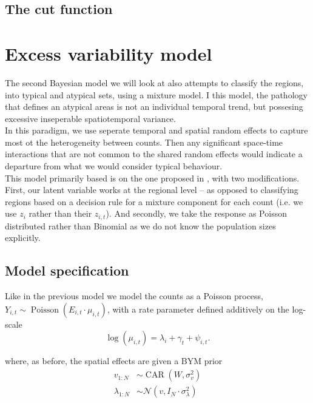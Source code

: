 \documentclass[11pt]{report}
\begin{document}
\section{The cut function}


\chapter{Excess variability model}

The second Bayesian model we will look at also attempts to classify the regions, into typical and atypical sets, using a mixture model. I this model, the pathology that defines an atypical areas is not an individual temporal trend, but possesing excessive inseperable spatiotemporal variance. \\

In this paradigm, we use seperate temporal and spatial random effects to capture most ot the heterogeneity between counts. Then any significant space-time interactions that are not common to the shared random effects would indicate a departure from what we would consider typical behaviour. \\

This model primarily based is on the one proposed in \citet{stability}, with two modifications. First, our latent variable works at the regional level -- as opposed to classifying regions based on a decision rule for a mixture component for each count (i.e. we use $z_{i}$ rather than their $z_{i,t}$). And secondly, we take the response as Poisson distributed rather than Binomial as we do not know the population sizes explicitly.

\section{Model specification}

Like in the previous model we model the counts as a Poisson process, $Y_{i,t} \sim \operatorname{Poisson}(E_{i,t} \cdot \mu_{i,t})$, with a rate parameter defined additively on the log-scale
\begin{equation}
\log(\mu_{i,t}) = \lambda_i + \gamma_t + \psi_{i,t}.
\end{equation}

where, as before, the spatial effects are given a BYM prior
\begin{align*}
v_{1:N} &\sim \operatorname{CAR}(W, \sigma_v^2) \\
\lambda_{1:N} &\sim \mathcal{N}(v, I_N \cdot \sigma_\lambda^2) \\
\end{align*}
\end{document}
